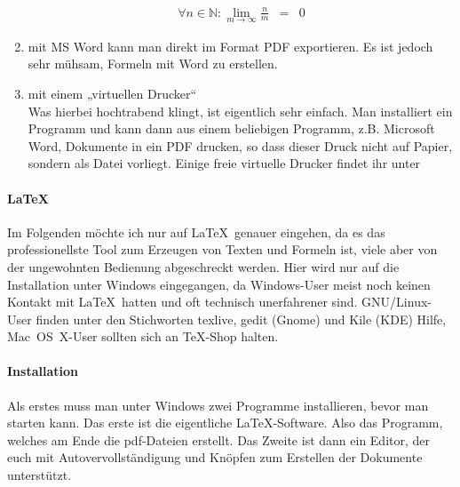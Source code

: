 \begin{enumerate}
\begin{eqnarray*}
               \forall n\in\mathbb{N}:\lim
                                  \limits_{m\to \infty}\frac{n}{m} & = & 0
          \end{eqnarray*}
    \item mit MS Word kann man direkt im Format PDF exportieren. Es ist jedoch sehr mühsam, Formeln mit Word zu erstellen.
    \item mit einem „virtuellen Drucker“\\
          Was hierbei hochtrabend klingt, ist eigentlich sehr einfach.
          Man installiert ein Programm und kann dann aus einem beliebigen Programm, z.B. Microsoft Word, Dokumente in ein PDF drucken,
          so dass dieser Druck nicht auf Papier, sondern als Datei vorliegt.
          Einige freie virtuelle Drucker findet ihr unter\\
\end{enumerate}

\paragraph{\LaTeX}
Im Folgenden möchte ich nur auf \LaTeX~genauer eingehen, da es das professionellste Tool zum Erzeugen von Texten und Formeln ist, viele aber von der ungewohnten Bedienung abgeschreckt werden.
Hier wird nur auf die Installation unter Windows eingegangen, da Windows-User meist noch keinen Kontakt mit \LaTeX~hatten und oft technisch unerfahrener sind.
GNU/Linux-User finden unter den Stichworten texlive, gedit (Gnome) und Kile (KDE) Hilfe, Mac~OS~X-User sollten sich an TeX-Shop halten.

\paragraph{Installation}
Als erstes muss man unter Windows zwei Programme installieren, bevor man starten kann.
Das erste ist die eigentliche \LaTeX -Software.
Also das Programm, welches am Ende die pdf-Dateien erstellt.
Das Zweite ist dann ein Editor, der euch mit Autovervollständigung und Knöpfen zum Erstellen der Dokumente unterstützt.

